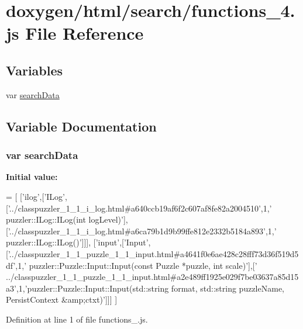 \hypertarget{a00087}{}\section{doxygen/html/search/functions\+\_\+4.js File Reference}
\label{a00087}
\subsection*{Variables}
\begin{DoxyCompactItemize}
\item 
var \hyperlink{a00087_ad01a7523f103d6242ef9b0451861231e}{search\+Data}
\end{DoxyCompactItemize}


\subsection{Variable Documentation}
\hypertarget{a00087_ad01a7523f103d6242ef9b0451861231e}{}
\subsubsection[{search\+Data}]{\setlength{\rightskip}{0pt plus 5cm}var search\+Data}\label{a00087_ad01a7523f103d6242ef9b0451861231e}
{\bfseries Initial value\+:}
\begin{DoxyCode}
=
[
  [\textcolor{stringliteral}{'ilog'},[\textcolor{stringliteral}{'ILog'},[\textcolor{stringliteral}{'../classpuzzler\_1\_1\_i\_log.html#a640ccb19af6f2c607af8fe82a2004510'},1,\textcolor{stringliteral}{'
      puzzler::ILog::ILog(int logLevel)'}],[\textcolor{stringliteral}{'../classpuzzler\_1\_1\_i\_log.html#a6ca79b1d9b99ffe812e2332b5184a893'},1,\textcolor{stringliteral}{'
      puzzler::ILog::ILog()'}]]],
  [\textcolor{stringliteral}{'input'},[\textcolor{stringliteral}{'Input'},[\textcolor{stringliteral}{'../classpuzzler\_1\_1\_puzzle\_1\_1\_input.html#a4641f0e6ae428c28fff73d36f519d5df'},1,\textcolor{stringliteral}{'
      puzzler::Puzzle::Input::Input(const Puzzle *puzzle, int scale)'}],[\textcolor{stringliteral}{'
      ../classpuzzler\_1\_1\_puzzle\_1\_1\_input.html#a2e489ff1925e029f7be03637a85d15a3'},1,\textcolor{stringliteral}{'puzzler::Puzzle::Input::Input(std::string format, std::string puzzleName,
       PersistContext &amp;ctxt)'}]]]
]
\end{DoxyCode}


Definition at line 1 of file functions\+\_.\+js.

